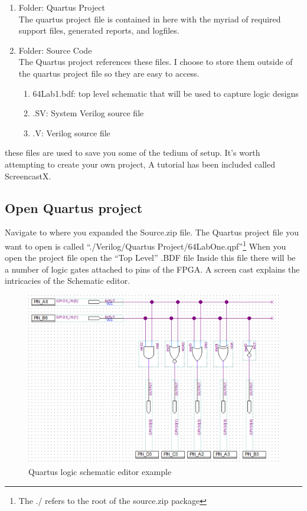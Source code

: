    \begin{enumerate}
    \item Folder: Quartus Project \\
      The quartus project file is contained in here with the myriad of required support files, generated reports, and logfiles.
    \item Folder: Source Code \\
      The Quartus project references these files. I choose to store them outside of the quartus project file so they are easy to access.
      \begin{enumerate}
        \item 64Lab1.bdf: top level schematic that will be used to capture logic designs
        \item .SV: System Verilog source file
        \item .V: Verilog source file
      \end{enumerate}
    \end{enumerate}
    these files are used to save you some of the tedium of setup. It's worth attempting to create your own project, A tutorial has been included called ScreencastX.
    
    \subsection{Open Quartus project}
    Navigate to where you expanded the Source.zip file. The Quartus project file you want to open is called
    ``./Verilog/Quartus Project/64LabOne.qpf''\footnote{The ./ refers to the root of the source.zip package} When you open the project file open the ``Top Level'' .BDF file
    Inside this file there will be a number of logic gates attached to pins of the FPGA. A screen cast explains the
    intricacies of the Schematic editor. 
    \begin{figure}[htpb]
      \includegraphics[width=.48\textwidth]{Images/LogicPreview.png}
      \caption{Quartus logic schematic editor example}
    \end{figure}

